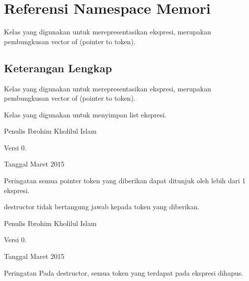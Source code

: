 \hypertarget{namespaceMemori}{}\section{Referensi Namespace Memori}
\label{namespaceMemori}


Kelas yang digunakan untuk merepresentasikan ekspresi, merupakan pembungkusan vector of (pointer to token).  




\subsection{Keterangan Lengkap}
Kelas yang digunakan untuk merepresentasikan ekspresi, merupakan pembungkusan vector of (pointer to token). 

Kelas yang digunakan untuk menyimpan list ekspresi.

\begin{DoxyAuthor}{Penulis}
Ibrohim Kholilul Islam 
\end{DoxyAuthor}
\begin{DoxyVersion}{Versi}
0. 
\end{DoxyVersion}
\begin{DoxyDate}{Tanggal}
Maret 2015 
\end{DoxyDate}
\begin{DoxyWarning}{Peringatan}
semua pointer token yang diberikan dapat ditunjuk oleh lebih dari 1 ekspresi. 

destructor tidak bertangung jawab kepada token yang diberikan.
\end{DoxyWarning}
\begin{DoxyAuthor}{Penulis}
Ibrohim Kholilul Islam 
\end{DoxyAuthor}
\begin{DoxyVersion}{Versi}
0. 
\end{DoxyVersion}
\begin{DoxyDate}{Tanggal}
Maret 2015 
\end{DoxyDate}
\begin{DoxyWarning}{Peringatan}
Pada destructor, semua token yang terdapat pada ekspresi dihapus. 
\end{DoxyWarning}
